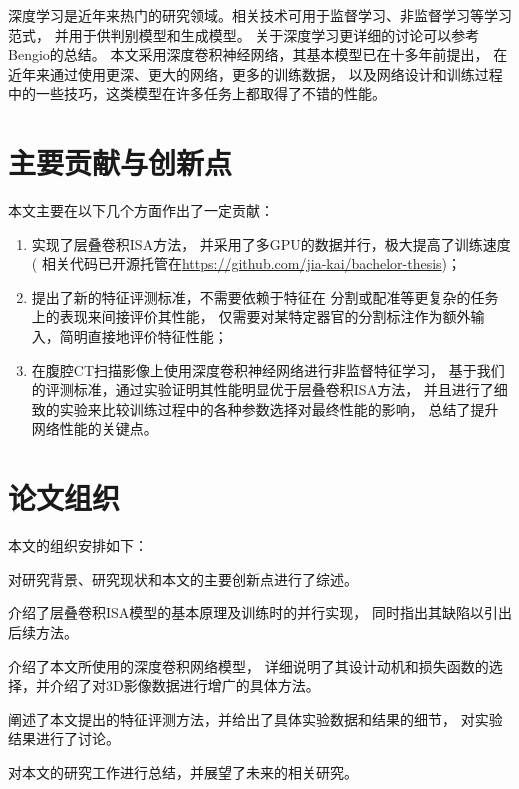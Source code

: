 深度学习是近年来热门的研究领域。相关技术可用于监督学习、非监督学习等学习范式，
并用于供判别模型和生成模型。
关于深度学习更详细的讨论可以参考Bengio的总结\cite{bengio2009learning}。
本文采用深度卷积神经网络，其基本模型已在十多年前提出\cite{lecun1998gradient}，
在近年来通过使用更深、更大的网络，更多的训练数据，
以及网络设计和训练过程中的一些技巧，这类模型在许多任务上都取得了不错的性能。


\section{主要贡献与创新点}
本文主要在以下几个方面作出了一定贡献：

\begin{enumerate}
    \item 实现了层叠卷积ISA方法\cite{wu2013unsupervised}，
        并采用了多GPU的数据并行，极大提高了训练速度(
        相关代码已开源托管在\url{https://github.com/jia-kai/bachelor-thesis})；
    \item 提出了新的特征评测标准，不需要依赖于特征在
        分割或配准等更复杂的任务上的表现来间接评价其性能，
        仅需要对某特定器官的分割标注作为额外输入，简明直接地评价特征性能；
    \item 在腹腔CT扫描影像上使用深度卷积神经网络进行非监督特征学习，
        基于我们的评测标准，通过实验证明其性能明显优于层叠卷积ISA方法，
        并且进行了细致的实验来比较训练过程中的各种参数选择对最终性能的影响，
        总结了提升网络性能的关键点。
\end{enumerate}

\section{论文组织}
本文的组织安排如下：

对研究背景、研究现状和本文的主要创新点进行了综述。

介绍了层叠卷积ISA模型的基本原理及训练时的并行实现，
同时指出其缺陷以引出后续方法。

介绍了本文所使用的深度卷积网络模型，
详细说明了其设计动机和损失函数的选择，并介绍了对3D影像数据进行增广的具体方法。

阐述了本文提出的特征评测方法，并给出了具体实验数据和结果的细节，
对实验结果进行了讨论。

对本文的研究工作进行总结，并展望了未来的相关研究。

